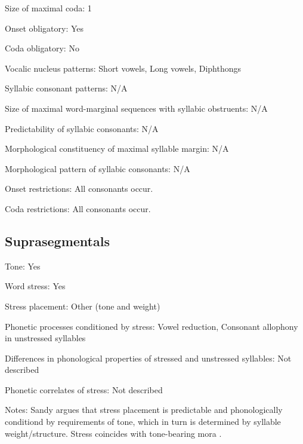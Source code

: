 {\begin{appendixdesc}
\item[Size of maximal coda:] 1

\item[Onset obligatory:] Yes

\item[Coda obligatory:] No

\item[Vocalic nucleus patterns:] Short vowels, Long vowels, Diphthongs

\item[Syllabic consonant patterns:] N/A

\item[Size of maximal word-marginal sequences with syllabic obstruents:] N/A

\item[Predictability of syllabic consonants:] N/A

\item[Morphological constituency of maximal syllable margin:] N/A

\item[Morphological pattern of syllabic consonants:] N/A

\item[Onset restrictions:] All consonants occur.

\item[Coda restrictions:] All consonants occur.
\end{appendixdesc}
\subsection*{Suprasegmentals}
\begin{appendixdesc}
\item[Tone:] Yes

\item[Word stress:] Yes

\item[Stress placement:] Other (tone and weight)

\item[Phonetic processes conditioned by stress:] Vowel reduction, Consonant allophony in unstressed syllables

\item[Differences in phonological properties of stressed and unstressed syllables:] Not described

\item[Phonetic correlates of stress:] Not described

\item[Notes:] Sandy argues that stress placement is predictable and phonologically conditiond by requirements of tone, which in turn is determined by syllable weight/structure. Stress coincides with tone-bearing mora \citep[40]{Sandy2014}.
\end{appendixdesc}
}

